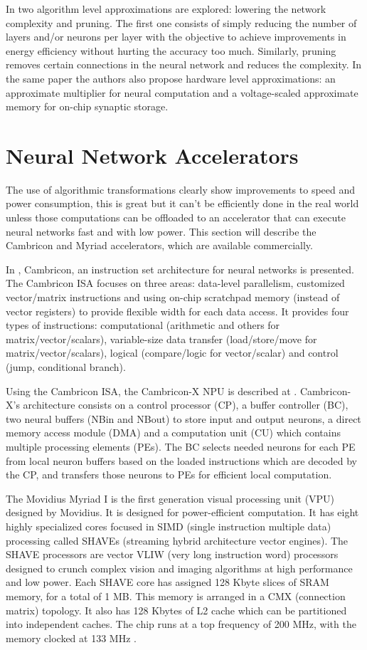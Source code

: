 In \cite{Sarwar2018} two algorithm level approximations are explored: lowering the network complexity and pruning. The first one consists of simply reducing the number of layers and/or neurons per layer with the objective to achieve improvements in energy efficiency without hurting the accuracy too much. Similarly, pruning removes certain connections in the neural network and reduces the complexity. In the same paper the authors also propose hardware level approximations: an approximate multiplier for neural computation and a voltage-scaled approximate memory for on-chip synaptic storage.

\section{Neural Network Accelerators}

The use of algorithmic transformations clearly show improvements to speed and power consumption, this is great but it can't be efficiently done in the real world unless those computations can be offloaded to an accelerator that can execute neural networks fast and with low power. This section will describe the Cambricon and Myriad accelerators, which are available commercially.

In \cite{Liu2016}, Cambricon, an instruction set architecture for neural networks is presented. The Cambricon ISA focuses on three areas: data-level parallelism, customized vector/matrix instructions and using on-chip scratchpad memory (instead of vector registers) to provide flexible width for each data access. It provides four types of instructions: computational (arithmetic and others for matrix/vector/scalars), variable-size data transfer (load/store/move for matrix/vector/scalars), logical (compare/logic for vector/scalar) and control (jump, conditional branch).

Using the Cambricon ISA, the Cambricon-X NPU is described at \cite{Zhang2016}. Cambricon-X's architecture consists on a control processor (CP), a buffer controller (BC), two neural buffers (NBin and NBout) to store input and output neurons, a direct memory access module (DMA) and a computation unit (CU) which contains multiple processing elements (PEs). The BC selects needed neurons for each PE from local neuron buffers based on the loaded instructions which are decoded by the CP, and transfers those neurons to PEs for efficient local computation.

The Movidius Myriad I is the first generation visual processing unit (VPU) designed by Movidius. It is designed for power-efficient computation. It has eight highly specialized cores focused in SIMD (single instruction multiple data) processing called SHAVEs (streaming hybrid architecture vector engines). The SHAVE processors are vector VLIW (very long instruction word) processors designed to crunch complex vision and imaging algorithms at high performance and low power. Each SHAVE core has assigned 128 Kbyte slices of SRAM memory, for a total of 1 MB. This memory is arranged in a CMX (connection matrix) topology. It also has 128 Kbytes of L2 cache which can be partitioned into independent caches. The chip runs at a top frequency of 200 MHz, with the memory clocked at 133 MHz \cite{Ionica2015}.

